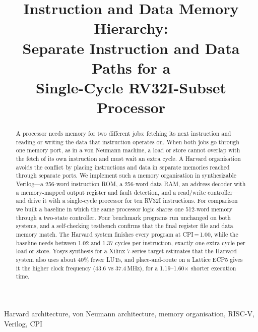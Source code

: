 \documentclass[conference]{IEEEtran}
\begin{document}
\title{Instruction and Data Memory Hierarchy:\\
Separate Instruction and Data Paths for a\\Single-Cycle RV32I-Subset Processor}

\author{
}

\maketitle

\begin{abstract}
A processor needs memory for two different jobs: fetching its next instruction and reading or
writing the data that instruction operates on. When both jobs go through one memory port, as in a
von Neumann machine, a load or store cannot overlap with the fetch of its own instruction and
must wait an extra cycle. A Harvard organisation avoids the conflict by placing instructions and
data in separate memories reached through separate ports. We implement such a memory organisation
in synthesizable Verilog---a 256-word instruction ROM, a 256-word data RAM, an address decoder
with a memory-mapped output register and fault detection, and a read/write controller---and drive
it with a single-cycle processor for ten RV32I instructions. For comparison we built a baseline in
which the same processor logic shares one 512-word memory through a two-state controller. Four
benchmark programs run unchanged on both systems, and a self-checking testbench confirms that the
final register file and data memory match. The Harvard system finishes every program at
CPI\,=\,1.00, while the baseline needs between 1.02 and 1.37 cycles per instruction, exactly one
extra cycle per load or store. Yosys synthesis for a Xilinx 7-series target estimates that the
Harvard system also uses about 40\% fewer LUTs, and place-and-route on a Lattice ECP5 gives it the
higher clock frequency (43.6 vs 37.4\,MHz), for a 1.19--1.60$\times$ shorter execution time.
\end{abstract}

\begin{IEEEkeywords}
Harvard architecture, von Neumann architecture, memory organisation, RISC-V, Verilog, CPI
\end{IEEEkeywords}
\end{document}
